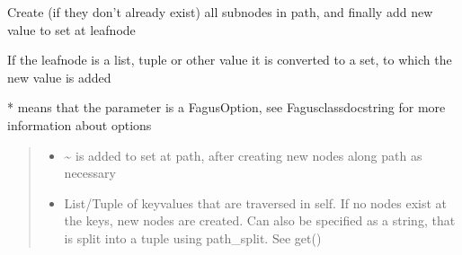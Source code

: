 \documentclass[a4paper,10pt,english]{sphinxmanual}
\begin{document}
\begin{fulllineitems}
\begin{fulllineitems}
\label{\detokenize{fagus.fagus:fagus.fagus.Fagus.add}}
\pysigstartsignatures
{}
\pysigstopsignatures
\sphinxAtStartPar
Create (if they don’t already exist) all sub\sphinxhyphen{}nodes in path, and finally add new value to set at leaf\sphinxhyphen{}node

\sphinxAtStartPar
If the leaf\sphinxhyphen{}node is a list, tuple or other value it is converted to a set, to which the new value is added

\sphinxAtStartPar
* means that the parameter is a FagusOption, see Fagus\sphinxhyphen{}class\sphinxhyphen{}docstring for more information about options
\begin{quote}\begin{description}
\begin{itemize}
\item {}
\sphinxAtStartPar
{} \textendash{} \textasciitilde{} is added to set at path, after creating new nodes along path as necessary

\item {}
\sphinxAtStartPar
{} \textendash{} List/Tuple of key\sphinxhyphen{}values that are traversed in self. If no nodes exist at the keys, new nodes are
created. Can also be specified as a string, that is split into a tuple using path\_split. See get()


\end{itemize}
\end{description}
\end{quote}
\end{fulllineitems}
\end{fulllineitems}
\end{document}
